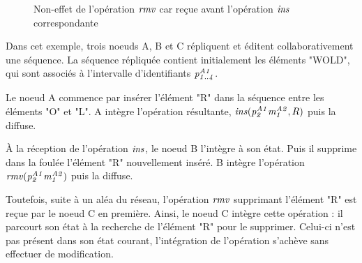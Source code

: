 \begin{figure}[!ht]
{
  }
  \caption{Non-effet de l'opération $\mathit{rmv}$ car reçue avant l'opération $\mathit{ins}$ correspondante}
  \label{fig:why-causal-remove}
\end{figure}

Dans cet exemple, trois noeuds A, B et C répliquent et éditent collaborativement une séquence.
La séquence répliquée contient initialement les éléments "WOLD", qui sont associés à l'intervalle d'identifiants $\mathit{p}^{\mathit{A1}}_{\mathit{1..4}}$.

Le noeud A commence par insérer l'élément "R" dans la séquence entre les éléments "O" et "L".
A intègre l'opération résultante, $\mathit{ins}(\mathit{p}^{\mathit{A1}}_{\mathit{2}}\mathit{m}^{\mathit{A2}}_{\mathit{1}},R)$ puis la diffuse.

À la réception de l'opération $\mathit{ins}$, le noeud B l'intègre à son état.
Puis il supprime dans la foulée l'élément "R" nouvellement inséré.
B intègre l'opération $\mathit{rmv}(\mathit{p}^{\mathit{A1}}_{\mathit{2}}\mathit{m}^{\mathit{A2}}_{\mathit{1}})$ puis la diffuse.

Toutefois, suite à un aléa du réseau, l'opération $\mathit{rmv}$ supprimant l'élément "R" est reçue par le noeud C en première.
Ainsi, le noeud C intègre cette opération : il parcourt son état à la recherche de l'élément "R" pour le supprimer.
Celui-ci n'est pas présent dans son état courant, l'intégration de l'opération s'achève sans effectuer de modification.

